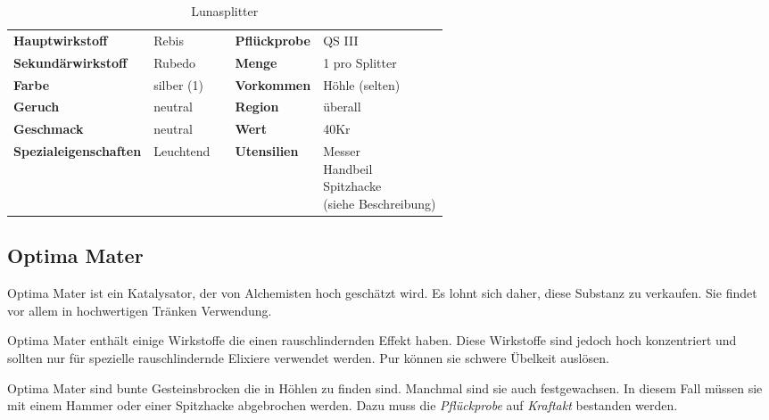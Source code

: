 \begin{table}[H] 
\begin{center} 
\begin{tabular}{|l|l|p{1cm}|l|l|} 
  	\cline{1-2} \cline{4-5} 
  	\textbf{Hauptwirkstoff} & Rebis && \textbf{Pflückprobe} & QS III \\ \cline{1-2} \cline{4-5} 
  	\textbf{Sekundärwirkstoff} & Rubedo && \textbf{Menge} & 1 pro Splitter \\ \cline{1-2} \cline{4-5} 
  	\textbf{Farbe} & silber (1) && \textbf{Vorkommen} & Höhle (selten) \\ \cline{1-2} \cline{4-5} 
  	\textbf{Geruch} & neutral && \textbf{Region} & überall \\ \cline{1-2} \cline{4-5} 
  	\textbf{Geschmack} & neutral && \textbf{Wert} & 40Kr \\ \cline{1-2} \cline{4-5} 
  	\textbf{Spezialeigenschaften} & Leuchtend && \textbf{Utensilien} & \brcell{Messer \\ Handbeil \\ Spitzhacke \\ (siehe Beschreibung)} \\ \cline{1-2} \cline{4-5} 
\end{tabular} 
\end{center} 
\caption{Lunasplitter} 
\label{tab:lunasplitter} 
\end{table}


\subsection{Optima Mater}
Optima Mater ist ein Katalysator, der von Alchemisten hoch geschätzt wird. Es lohnt sich daher, diese Substanz zu verkaufen. Sie findet vor allem in hochwertigen Tränken Verwendung. 

Optima Mater enthält einige Wirkstoffe die einen rauschlindernden Effekt haben. Diese Wirkstoffe sind jedoch hoch konzentriert und sollten nur für spezielle rauschlindernde Elixiere verwendet werden. Pur können sie schwere Übelkeit auslösen.

Optima Mater sind bunte Gesteinsbrocken die in Höhlen zu finden sind. Manchmal sind sie auch festgewachsen. In diesem Fall müssen sie mit einem Hammer oder einer Spitzhacke abgebrochen werden. Dazu muss die \textit{Pflückprobe} auf \textit{Kraftakt} bestanden werden.

